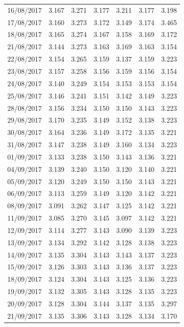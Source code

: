 \begin{longtable}{|c|c|c|c|c|c|c|}
\hline
16/08/2017 & 3.167 & 3.271 & 3.177 & 3.211 & 3.177 & 3.198 \\
17/08/2017 & 3.160 & 3.273 & 3.172 & 3.149 & 3.174 & 3.465 \\
18/08/2017 & 3.165 & 3.274 & 3.167 & 3.158 & 3.169 & 3.172 \\
21/08/2017 & 3.144 & 3.273 & 3.163 & 3.169 & 3.163 & 3.154 \\
22/08/2017 & 3.154 & 3.265 & 3.159 & 3.137 & 3.159 & 3.223 \\
23/08/2017 & 3.157 & 3.258 & 3.156 & 3.159 & 3.156 & 3.154 \\
24/08/2017 & 3.140 & 3.249 & 3.154 & 3.153 & 3.153 & 3.154 \\
25/08/2017 & 3.146 & 3.241 & 3.151 & 3.142 & 3.149 & 3.223 \\
28/08/2017 & 3.156 & 3.234 & 3.150 & 3.150 & 3.143 & 3.223 \\
29/08/2017 & 3.170 & 3.235 & 3.149 & 3.152 & 3.138 & 3.223 \\
30/08/2017 & 3.164 & 3.236 & 3.149 & 3.172 & 3.135 & 3.221 \\
31/08/2017 & 3.147 & 3.238 & 3.149 & 3.160 & 3.134 & 3.223 \\
01/09/2017 & 3.133 & 3.238 & 3.150 & 3.143 & 3.136 & 3.221 \\
04/09/2017 & 3.139 & 3.240 & 3.150 & 3.120 & 3.140 & 3.221 \\
05/09/2017 & 3.120 & 3.249 & 3.150 & 3.150 & 3.143 & 3.221 \\
06/09/2017 & 3.113 & 3.259 & 3.149 & 3.120 & 3.142 & 3.221 \\
08/09/2017 & 3.091 & 3.262 & 3.147 & 3.125 & 3.142 & 3.221 \\
11/09/2017 & 3.085 & 3.270 & 3.145 & 3.097 & 3.142 & 3.221 \\
12/09/2017 & 3.114 & 3.277 & 3.143 & 3.090 & 3.139 & 3.223 \\
13/09/2017 & 3.134 & 3.292 & 3.142 & 3.128 & 3.138 & 3.223 \\
14/09/2017 & 3.135 & 3.304 & 3.143 & 3.143 & 3.137 & 3.223 \\
15/09/2017 & 3.126 & 3.303 & 3.143 & 3.136 & 3.137 & 3.223 \\
18/09/2017 & 3.124 & 3.304 & 3.143 & 3.125 & 3.136 & 3.223 \\
19/09/2017 & 3.132 & 3.305 & 3.143 & 3.128 & 3.135 & 3.223 \\
20/09/2017 & 3.128 & 3.304 & 3.144 & 3.137 & 3.135 & 3.297 \\
21/09/2017 & 3.135 & 3.306 & 3.143 & 3.128 & 3.134 & 3.170 \\

\end{longtable}
